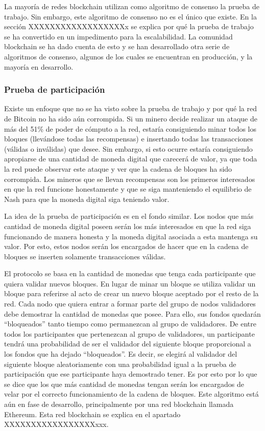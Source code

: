 La mayoría de redes blockchain utilizan como algoritmo de consenso la prueba de trabajo. Sin embargo, este algoritmo de consenso no es el único que existe. En la sección XXXXXXXXXXXXXXXXXXx se explica por qué la prueba de trabajo se ha convertido en un impedimento para la escalabilidad. La comunidad blockchain se ha dado cuenta de esto y se han desarrollado otra serie de algoritmos de consenso, algunos de los cuales se encuentran en producción, y la mayoría en desarrollo.

\subsubsection{Prueba de participación}
Existe un enfoque que no se ha visto sobre la prueba de trabajo y por qué la red de Bitcoin no ha sido aún corrompida. Si un minero decide realizar un ataque de más del 51\% de poder de cómputo a la red, estaría consiguiendo minar todos los bloques (llevándose todas las recompensas) e insertando todas las transacciones (válidas o inválidas) que desee. Sin embargo, si esto ocurre estaría consiguiendo apropiarse de una cantidad de moneda digital que carecerá de valor, ya que toda la red puede observar este ataque y ver que la cadena de bloques ha sido corrompida. Los mineros que se llevan recompensas son los primeros interesados en que la red funcione honestamente y que se siga manteniendo el equilibrio de Nash para que la moneda digital siga teniendo valor. \newline

La idea de la prueba de participación es en el fondo similar. Los nodos que más cantidad de moneda digital poseen serán los más interesados en que la red siga funcionando de manera honesta y la moneda digital asociada a esta mantenga su valor. Por esto, estos nodos serán los encargados de hacer que en la cadena de bloques se inserten solamente transacciones válidas. \newline

El protocolo se basa en la cantidad de monedas que tenga cada participante que quiera validar nuevos bloques. En lugar de minar un bloque se utiliza validar un bloque para referirse al acto de crear un nuevo bloque aceptado por el resto de la red. Cada nodo que quiera entrar a formar parte del grupo de nodos validadores debe demostrar la cantidad de monedas que posee. Para ello, sus fondos quedarán “bloqueados” tanto tiempo como permanezcan al grupo de validadores. De entre todos los participantes que pertenezcan al grupo de validadores, un participante tendrá una probabilidad de ser el validador del siguiente bloque proporcional a los fondos que ha dejado “bloqueados”. Es decir, se elegirá al validador del siguiente bloque aleatoriamente con una probabilidad igual a la prueba de participación que ese participante haya demostrado tener. Es por esto por lo que se dice que los que más cantidad de monedas tengan serán los encargados de velar por el correcto funcionamiento de la cadena de bloques.
Este algoritmo está aún en fase de desarrollo, principalmente por una red blockchain llamada Ethereum. Esta red blockchain se explica en el apartado XXXXXXXXXXXXXXXXXxxx.

